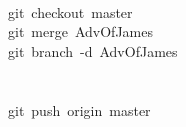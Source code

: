 \documentclass{beamer}\usepackage[]{graphicx}\usepackage[]{color}
\makeatletter
\newcommand{\hlopt}[1]{\textcolor[rgb]{0,0,0}{#1}}%
\newcommand{\hlstd}[1]{\textcolor[rgb]{0.345,0.345,0.345}{#1}}%
\newenvironment{kframe}{%
 \def\at@end@of@kframe{}%
 \ifinner\ifhmode%
  \def\at@end@of@kframe{\end{minipage}}%
  \begin{minipage}{\columnwidth}%
 \fi\fi%
 \def\FrameCommand##1{\hskip\@totalleftmargin \hskip-\fboxsep
 \colorbox{shadecolor}{##1}\hskip-\fboxsep
     \hskip-\linewidth \hskip-\@totalleftmargin \hskip\columnwidth}%
 \MakeFramed {\advance\hsize-\width
   \@totalleftmargin\z@ \linewidth\hsize
   \@setminipage}}%
 {\par\unskip\endMakeFramed%
 \at@end@of@kframe}
\newenvironment{knitrout}{}{} %
\makeatother
\begin{document}
\begin{frame}[fragile]
\begin{knitrout}
\begin{kframe}
\hspace*{\fill}\\
\hlstd{git\ checkout\ master}\hlstd{\ \ \ \ \ \ }\hlstd{}\hspace*{\fill}\\
\hlstd{git\ merge\ AdvOfJames}\hlstd{\ \ \ \ \ }\hlstd{}\hspace*{\fill}\\
\hlstd{git\ branch\ }\hlopt{{-}}\hlstd{d\ AdvOfJames\ }\hspace*{\fill}\\
\hlstd{}\hspace*{\fill}\\
\hspace*{\fill}\\
\hlstd{git\ push\ origin\ master}\hspace*{\fill}
\mbox{}
\normalfont
\end{kframe}
\end{knitrout}
\end{frame}
\end{document}
